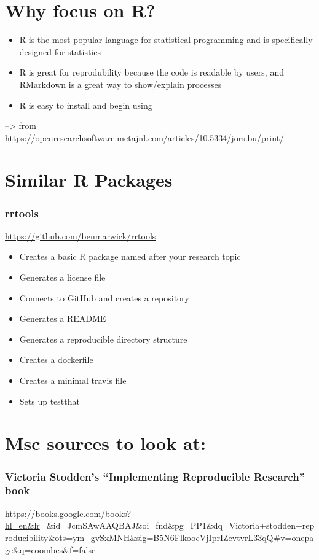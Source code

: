 \documentclass[12pt]{article}
\providecommand{\tightlist}{%
  \setlength{\itemsep}{0pt}\setlength{\parskip}{0pt}}
\begin{document}
\section{Why focus on R?}\label{why-focus-on-r}

\begin{itemize}
\tightlist
\item
  R is the most popular language for statistical programming and is
  specifically designed for statistics
\item
  R is great for reprodubility because the code is readable by users,
  and RMarkdown is a great way to show/explain processes
\item
  R is easy to install and begin using
\end{itemize}

--\textgreater{} from
\url{https://openresearchsoftware.metajnl.com/articles/10.5334/jors.bu/print/}

\section{Similar R Packages}\label{similar-r-packages}

\subsubsection{rrtools}\label{rrtools}

\url{https://github.com/benmarwick/rrtools}

\begin{itemize}
\tightlist
\item
  Creates a basic R package named after your research topic
\item
  Generates a license file
\item
  Connects to GitHub and creates a repository
\item
  Generates a README
\item
  Generates a reproducible directory structure
\item
  Creates a dockerfile
\item
  Creates a minimal travis file
\item
  Sets up testthat
\end{itemize}

\section{Msc sources to look at:}\label{msc-sources-to-look-at}

\subsubsection{\texorpdfstring{Victoria Stodden's ``Implementing
Reproducible Research''
book}{Victoria Stodden's Implementing Reproducible Research book}}\label{victoria-stoddens-implementing-reproducible-research-book}

\url{https://books.google.com/books?hl=en\&lr}=\&id=JcmSAwAAQBAJ\&oi=fnd\&pg=PP1\&dq=Victoria+stodden+reproducibility\&ots=ym\_gvSxMNH\&sig=B5N6FlkoocVjIprIZevtvrL33qQ\#v=onepage\&q=coombes\&f=false



\end{document}
